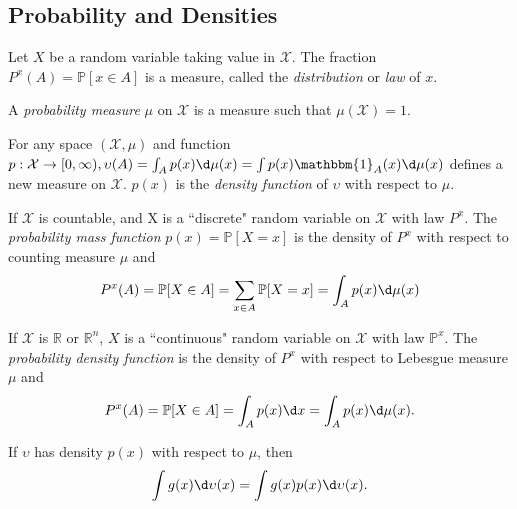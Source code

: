 \documentclass[a4paper]{article}
\begin{document}
\subsection{Probability and Densities}

\begin{eg}
	Let $X$ be a random variable taking value in $\mathcal{X}$. The fraction $P^x (A) = \mathbb{P} [x \in A]$ is a measure, called the \emph{distribution} or \emph{law} of $x$.
\end{eg}

\begin{defi}
	A \emph{probability measure} $\mu$ on $\mathcal{X}$ is a measure such that $\mu(\mathcal{X}) = 1$.
\end{defi}
 
 \begin{defi}
 For any space $(\mathcal{X}, \mu)$ and function $p: \mathcal{X} \to [0, \infty), \upsilon (A) = \int_A p(x) \d \mu (x) = \int p(x) \mathbbm{1}_A (x) \d \mu (x)$ defines a new measure on $\mathcal{X}$. $p(x)$ is the \emph{density function} of $\upsilon$ with respect to $\mu$.
 \end{defi}

\begin{eg}
	If $\mathcal{X}$ is countable, and X is a ``discrete" random variable on $\mathcal{X}$ with law $P^x$. The \emph{probability mass function} $p(x) = \mathbb{P}[X = x]$ is the density of $P^x$ with respect to counting measure $\mu$ and
	\begin{equation}
		P^x (A) = \mathbb{P} [X \in A] = \sum\limits_{x \in A} \mathbb{P} [X = x]= \int_A p(x) \d \mu (x) 
	\end{equation}
\end{eg}

\begin{eg}
	If $\mathcal{X}$ is $\mathbb{R}$ or $\mathbb{R}^n$, $X$ is a ``continuous" random variable on $\mathcal{X}$ with law $\mathbb{P}^x$. The \emph{probability density function} is the density of $P^x$ with respect to Lebesgue measure $\mu$ and
	\begin{equation}
		P^x (A) = \mathbb{P}[X \in A] = \int_A p(x) \d x = \int_A p(x) \d \mu (x).
	\end{equation}
\end{eg}

\begin{prop}
	If $\upsilon$ has density $p(x)$ with respect to $\mu$, then
	\begin{equation}
		\int g(x) \d \upsilon (x) = \int g(x)p(x) \d \upsilon (x).
	\end{equation}
\end{prop}
\end{document}
